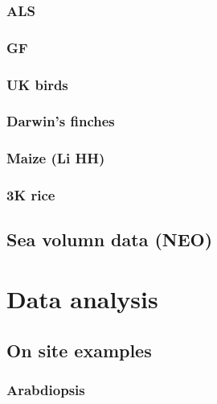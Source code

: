 \documentclass[]{book}
\begin{document}
\hypertarget{als}{%
\subsection{ALS}\label{als}}

\hypertarget{gf}{%
\subsection{GF}\label{gf}}

\hypertarget{uk-birds}{%
\subsection{UK birds}\label{uk-birds}}

\hypertarget{darwins-finches}{%
\subsection{Darwin's finches}\label{darwins-finches}}

\hypertarget{maize-li-hh}{%
\subsection{Maize (Li HH)}\label{maize-li-hh}}

\hypertarget{k-rice}{%
\subsection{3K rice}\label{k-rice}}

\hypertarget{sea-volumn-data-neo}{%
\section{Sea volumn data (NEO)}\label{sea-volumn-data-neo}}

\hypertarget{data-analysis}{%
\chapter{Data analysis}\label{data-analysis}}

\hypertarget{on-site-examples}{%
\section{On site examples}\label{on-site-examples}}

\hypertarget{arabdiopsis-1}{%
\subsection{Arabdiopsis}\label{arabdiopsis-1}}
\end{document}

